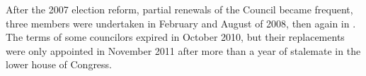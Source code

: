 After the 2007 election reform, partial renewals of the Council became frequent, three members were undertaken in February and August of 2008, then again in . The terms of some councilors expired in October 2010, but their replacements were only appointed in November 2011 after more than a year of stalemate in the lower house of Congress.

 

